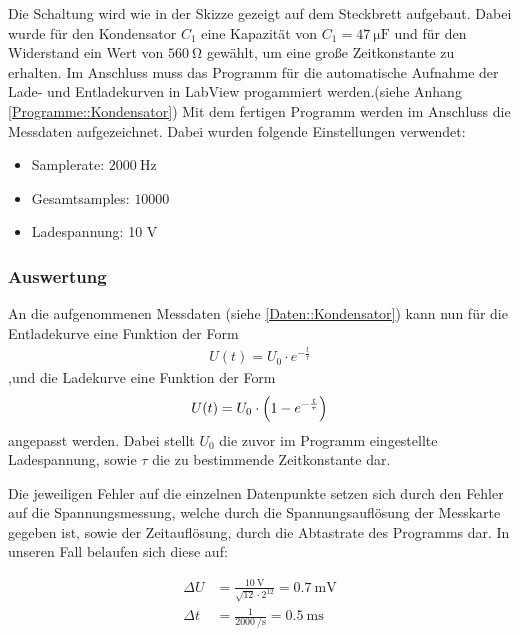 \documentclass[12pt,twoside,a4paper]{scrartcl}
\begin{document}
				Die Schaltung wird wie in der Skizze gezeigt auf dem Steckbrett aufgebaut. Dabei wurde für den Kondensator $C_1$ eine Kapazität von $C_1 = \SI{47}{\micro \farad}$ und für den Widerstand ein Wert von $\SI{560}{\ohm}$ gewählt, um eine große Zeitkonstante zu erhalten. Im Anschluss muss das Programm für die automatische Aufnahme der Lade- und Entladekurven in LabView progammiert werden.(siehe Anhang \ref{Programme::Kondensator}) Mit dem fertigen Programm werden im Anschluss die Messdaten aufgezeichnet. Dabei wurden folgende Einstellungen verwendet:

				\begin{itemize}
					\item Samplerate: $\SI{2000}{\hertz}$
					\item Gesamtsamples: $ 10000 $
					\item Ladespannung: 10 V
				\end{itemize}

				\newpage

			\subsubsection{Auswertung}

				An die aufgenommenen Messdaten (siehe \ref{Daten::Kondensator}) kann nun für die Entladekurve eine Funktion der Form
				\begin{align*}
					U(t) = U_0 \cdot e^{-\frac{t}{\tau}}
				\end{align*}
				,und die Ladekurve eine Funktion der Form
				\begin{align*}
					U(t) = U_0 \cdot \qty(1-e^{-\frac{t}{\tau}})
				\end{align*}
				angepasst werden. Dabei stellt $U_0$ die zuvor im Programm eingestellte Ladespannung, sowie $\tau$ die zu bestimmende Zeitkonstante dar.

				Die jeweiligen Fehler auf die einzelnen Datenpunkte setzen sich durch den Fehler auf die Spannungsmessung, welche durch die Spannungsauflösung der Messkarte gegeben ist, sowie der Zeitauflösung, durch die Abtastrate des Programms dar. In unseren Fall belaufen sich diese auf:

				\begin{align}
					\label{Kondensator::Messfehler}
					\Delta U &= \frac{\SI{10}{\volt}}{\sqrt{12} \cdot 2^{12}} = \SI{0.7}{\milli \volt} \\
					\Delta t &= \frac{1}{\SI{2000}{\per \second}} =  \SI{0.5}{\milli \second} %
				\end{align}
\end{document}
